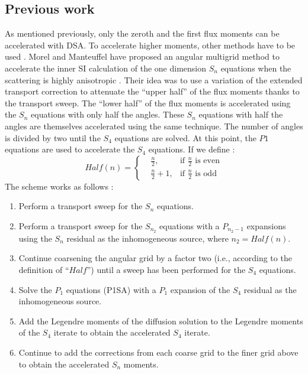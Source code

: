 \subsection{Previous work}
As mentioned previously, only the zeroth and the first flux moments can be
accelerated with DSA. To accelerate higher moments, other methods have to be
used \cite{kassem,multigrid_1d}. Morel and Manteuffel have proposed an angular 
multigrid method to accelerate the inner SI calculation of the one dimension 
$S_n$ equations when the scattering is highly anisotropic 
\cite{multigrid_1d}. Their idea was to use a variation of the extended
transport correction \cite{lathrop} to attenuate the ``upper half'' of the
flux moments thanks to the transport sweep. The ``lower half'' of the flux
moments is accelerated using the $S_n$ equations with only half the angles.
These $S_n$ equations with half the angles are themselves accelerated using the same
technique. The number of angles is divided by two until the $S_4$ equations are
solved. At this point, the $P1$ equations are used to accelerate the $S_4$
equations. If we define :
\begin{equation}
Half(n) = \left\{
\begin{aligned}
&\frac{n}{2}, &\textrm{if $\frac{n}{2}$ is even}\\
&\frac{n}{2}+1, &\textrm{if $\frac{n}{2}$ is odd}
\end{aligned}
\right.
\end{equation}
The scheme works as follows : 
\begin{enumerate}
\item Perform a transport sweep for the $S_n$ equations.
\item Perform a transport sweep for the $S_{n_2}$ equations with a $P_{n_2-1}$
expansions using the $S_n$ residual as the inhomogeneous source, where
$n_2=Half(n)$.
\item Continue coarsening the angular grid by a factor two (i.e., according to
the definition of ``$Half$'') until a sweep has been performed for the $S_4$
equations.
\item Solve the $P_1$ equations (P1SA) with a $P_1$ expansion of the $S_4$
residual as the inhomogeneous source.
\item Add the Legendre moments of the diffusion solution to the Legendre
moments of the $S_4$ iterate to obtain the accelerated $S_4$ iterate.
\item Continue to add the corrections from each coarse grid to the finer grid
above to obtain the accelerated $S_n$ moments.
\end{enumerate}
